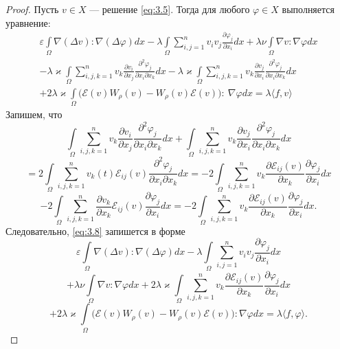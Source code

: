 \begin{proof}
Пусть $v \in X$ --- решение \ref{eq:3.5}. Тогда для любого $\varphi\in  X$ выполняется уравнение:
\begin{equation}\label{eq:3.8}
    \begin{gathered}
        \varepsilon\int\limits_{\Omega}\nabla (\Delta v):\nabla (\Delta\varphi)dx - \lambda\int\limits_{\Omega}\sum_{i,j=1}^n v_iv_j
        \frac{\partial\varphi_j}{\partial x_i}dx +\lambda\nu\int\limits_{\Omega}\nabla v : \nabla\varphi dx \\
        -\lambda\varkappa\int\limits_{\Omega}\sum_{i,j,k=1}^n v_k\frac{\partial v_i}{\partial x_j}\frac{\partial^2 \varphi_j}{\partial x_i\partial x_k}dx 
        -\lambda\varkappa\int\limits_{\Omega}\sum_{i,j,k=1}^n v_k\frac{\partial v_j}{\partial x_i}\frac{\partial^2 \varphi_j}{\partial x_i\partial x_k}dx \\
        +2\lambda\varkappa\int\limits_{\Omega}\bigg(\mathcal{E}(v)W_{\rho}(v)-W_{\rho}(v)\mathcal{E}(v)\bigg): \ \nabla\varphi dx=\lambda\langle f, v\rangle
    \end{gathered}
\end{equation}
    Запишем, что  
    $$\int\limits_{\Omega}\sum_{i,j,k=1}^n v_k\frac{\partial v_i}{\partial x_j}\frac{\partial^2 \varphi_j}{\partial x_i\partial x_k}dx+
    \int\limits_{\Omega}\sum_{i,j,k=1}^n v_k\frac{\partial v_j}{\partial x_i}\frac{\partial^2 \varphi_j}{\partial x_i\partial x_k}dx $$
    $$= 2\int\limits_{\Omega}\sum_{i,j,k=1}^n v_k(t)\mathcal{E}_{ij}(v)\frac{\partial^2 \varphi_j}{\partial x_i\partial x_k}dx=-2
    \int\limits_{\Omega}\sum_{i,j,k=1}^n v_k\frac{\partial\mathcal{E}_{ij}(v)}{\partial x_k}\frac{\partial\varphi_j}{\partial x_i}dx $$
    $$-2\int\limits_{\Omega}\sum_{i,j,k=1}^n\frac{\partial v_k}{\partial x_k}\mathcal{E}_{ij}(v)\frac{\partial\varphi_j}{\partial x_i}dx
    =-2\int\limits_{\Omega}\sum_{i,j,k=1}^n v_k \frac{\partial\mathcal{E}_{ij}(v)}{\partial x_k}\frac{\partial\varphi_j}{\partial x_i}dx.$$
    Следовательно, \ref{eq:3.8} запишется в форме
    $$\varepsilon\int\limits_{\Omega}\nabla(\Delta v):\nabla(\Delta\varphi)dx-\lambda\int\limits_{\Omega}\sum_{i,j=1}^n v_iv_j\frac{\partial\varphi_j}{\partial x_i}dx$$
    $$+\lambda\nu\int\limits_{\Omega}\nabla v:\nabla\varphi dx+2\lambda\varkappa\int\limits_{\Omega}\sum_{i,j,k=1}^n v_k\frac{\partial\mathcal{E}_{ij}(v)}{\partial x_k}\frac{\partial\varphi_j}{\partial x_i}dx$$
    $$+2\lambda\varkappa\int\limits_{\Omega}\bigg(\mathcal{E}(v)W_{\rho}(v)-W_{\rho}(v)\mathcal{E}(v)\bigg):\nabla\varphi dx=\lambda\langle f, \varphi\rangle.$$

\end{proof}
